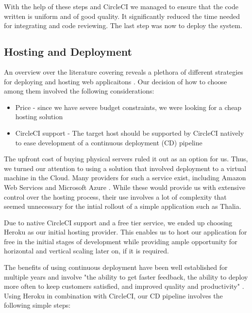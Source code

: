 \documentclass[main.tex]{subfiles}
\begin{document}
With the help of these steps and CircleCI we managed to ensure that the code written is uniform and of good quality. It significantly reduced the time needed for integrating and code reviewing. The last step was now to deploy the system. 

\subsection{Hosting and Deployment}
\label{Continuous Deployment}

An overview over the literature covering reveals a plethora of different strategies for deploying and hosting web applicaitons \cite{ConnollyFundamentals}. Our decision of how to choose among them involved the following considerations:

\begin{itemize}
	\item Price - since we have severe budget constraints, we were looking for a cheap hosting solution
	\item CircleCI support - The target host should be supported by CircleCI natively to ease development of a continuous deployment (CD) pipeline
\end{itemize}

The upfront cost of buying physical servers ruled it out as an option for us. Thus, we turned our attention to using a solution that involved deployment to a virtual machine in the Cloud. Many providers for such a service exist, including Amazon Web Services \cite{AWS} and Microsoft Azure \cite{Azure}. While these would provide us with extensive control over the hosting process, their use involves a lot of complexity that seemed unnecessary for the intial rollout of a simple application such as Thalia.

Due to native CircleCI support and a free tier service, we ended up choosing Heroku \cite{Heroku} as our initial hosting provider. This enables us to host our application for free in the initial stages of development while providing ample opportunity for horizontal and vertical scaling later on, if it is required.

The benefits of using continuous deployment have been well established for multiple years and involve "the ability to get faster feedback, the ability to deploy more often to keep customers satisfied, and improved quality and productivity" \cite{CDBenefits}. Using Heroku in combination with CircleCI, our CD pipeline involves the following simple steps:
\end{document}
